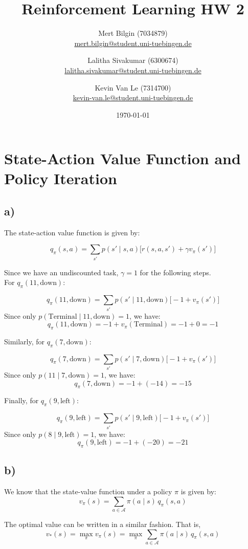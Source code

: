 \documentclass[11pt]{article}
\title{Reinforcement Learning HW 2}
\author{
Mert Bilgin (7034879) \\
\url{mert.bilgin@student.uni-tuebingen.de}
\and
Lalitha Sivakumar (6300674) \\
\url{lalitha.sivakumar@student.uni-tuebingen.de}
\and
Kevin Van Le (7314700) \\
\url{kevin-van.le@student.uni-tuebingen.de}
}
\date{\today}
\begin{document}
\maketitle

\section{State-Action Value Function and Policy Iteration}

\subsection*{a)}
The state-action value function is given by:

\[
q_{\pi}(s, a) = \sum_{s'} p(s' \mid s, a) \big[ r(s, a, s') + \gamma v_{\pi}(s') \big]
\]


Since we have an undiscounted task, $\gamma = 1$ for the following steps. \\


\noindent For \( q_{\pi}(11, \text{down}) \):

\[
q_{\pi}(11, \text{down}) 
= \sum_{s'} p(s' \mid 11, \text{down}) \big[ -1 + v_{\pi}(s') \big]
\]
Since only \( p(\text{Terminal} \mid 11, \text{down}) = 1 \), we have:
\[
q_{\pi}(11, \text{down}) = -1 + v_{\pi}(\text{Terminal}) = -1 + 0 = -1
\]


\noindent Similarly, for \( q_{\pi}(7, \text{down}) \):

\[
q_{\pi}(7, \text{down}) 
= \sum_{s'} p(s' \mid 7, \text{down}) \big[ -1 + v_{\pi}(s') \big]
\]
Since only \( p(11 \mid 7, \text{down}) = 1 \), we have:
\[
q_{\pi}(7, \text{down}) = -1 + (-14) = -15
\]


\noindent Finally, for \( q_{\pi}(9, \text{left}) \):

\[
q_{\pi}(9, \text{left}) 
= \sum_{s'} p(s' \mid 9, \text{left}) \big[ -1 + v_{\pi}(s') \big]
\]
Since only \( p(8 \mid 9, \text{left}) = 1 \), we have:
\[
q_{\pi}(9, \text{left}) = -1 + (-20) = -21
\]

\subsection*{b)}

We know that the state-value function under a policy $\pi$ is given by:
\[
v_{\pi}(s) = \sum_{a \in \mathcal{A}} \pi(a \mid s) \, q_{\pi}(s, a)
\]

The optimal value can be written in a similar fashion. That is,
\[
v_{*}(s) = \max_{\pi} v_{\pi}(s)
          = \max_{\pi} \sum_{a \in \mathcal{A}} \pi(a \mid s) \, q_{\pi}(s, a)
\]
\end{document}
